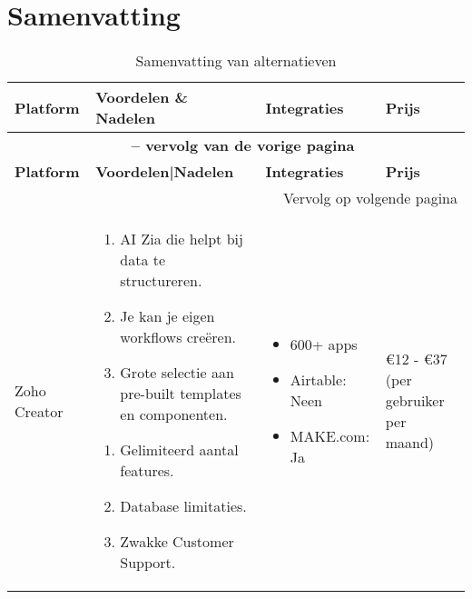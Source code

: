 \section{Samenvatting}%
\label{sec:samenvatting}
\begin{longtable}{p{2.5cm} p{5.5cm} p{3.5cm} p{2.5cm}}
    \caption{Samenvatting van alternatieven} \label{samenvatting-alternatieven} \\
    \toprule
    \textbf{Platform} & \textbf{Voordelen \& Nadelen} & \textbf{Integraties} & \textbf{Prijs} \\
    \midrule
    \endfirsthead

    \multicolumn{4}{c}{{\bfseries \tablename\ \thetable{} -- vervolg van de vorige pagina}} \\
    \toprule
    \textbf{Platform} & \textbf{Voordelen|Nadelen} & \textbf{Integraties} & \textbf{Prijs} \\
    \midrule
    \endhead

    \midrule
    \multicolumn{4}{r}{{Vervolg op volgende pagina}} \\
    \endfoot

    \bottomrule
    \endlastfoot

    Zoho Creator &
    \vspace{-\topsep}\vspace{-\partopsep} 
    \begin{enumerate}[leftmargin=2pt, topsep=0pt,parsep=0pt,noitemsep]
        \item[] AI Zia die helpt bij data te structureren.
        \item[] Je kan je eigen workflows creëren.
        \item[] Grote selectie aan pre-built templates en componenten.
    \end{enumerate}
    \begin{enumerate}[leftmargin=2pt, topsep=8pt,parsep=0pt,noitemsep]
        \item[] Gelimiteerd aantal features.
        \item[] Database limitaties.
        \item[] Zwakke Customer Support.
    \end{enumerate}
    & 
    \vspace{-\topsep}\vspace{-\partopsep} 
    \begin{itemize}[leftmargin=2pt, topsep=0pt,parsep=0pt,noitemsep]
        \item[] 600+ apps
        \item[] Airtable: Neen
        \item[] MAKE.com: Ja
    \end{itemize}
     &
    €12 - €37 (per gebruiker per maand)\\


\end{longtable}
